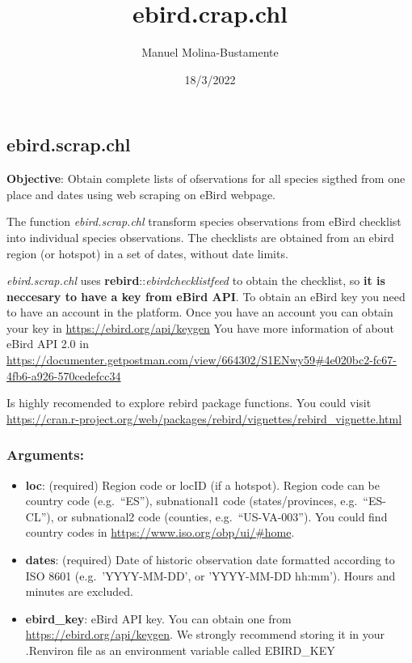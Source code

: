 \documentclass[
]{article}
\title{ebird.crap.chl}
\author{Manuel Molina-Bustamente}
\date{18/3/2022}
\begin{document}
\maketitle

\hypertarget{ebird.scrap.chl}{%
\subsection{ebird.scrap.chl}\label{ebird.scrap.chl}}

\textbf{Objective}: Obtain complete lists of ofservations for all
species sigthed from one place and dates using web scraping on eBird
webpage.

The function \emph{ebird.scrap.chl} transform species observations from
eBird checklist into individual species observations. The checklists are
obtained from an ebird region (or hotspot) in a set of dates, without
date limits.

\emph{ebird.scrap.chl} uses \textbf{rebird}::\emph{ebirdchecklistfeed}
to obtain the checklist, so \textbf{it is neccesary to have a key from
eBird API}. To obtain an eBird key you need to have an account in the
platform. Once you have an account you can obtain your key in
\url{https://ebird.org/api/keygen} You have more information of about
eBird API 2.0 in
\url{https://documenter.getpostman.com/view/664302/S1ENwy59\#4e020bc2-fc67-4fb6-a926-570cedefcc34}

Is highly recomended to explore rebird package functions. You could
visit
\url{https://cran.r-project.org/web/packages/rebird/vignettes/rebird_vignette.html}

\hypertarget{arguments}{%
\subsubsection{Arguments:}\label{arguments}}

\begin{itemize}
\item
  \textbf{loc}: (required) Region code or locID (if a hotspot). Region
  code can be country code (e.g.~``ES''), subnational1 code
  (states/provinces, e.g.~``ES-CL''), or subnational2 code (counties,
  e.g.~``US-VA-003''). You could find country codes in
  \url{https://www.iso.org/obp/ui/\#home}.
\item
  \textbf{dates}: (required) Date of historic observation date formatted
  according to ISO 8601 (e.g.~'YYYY-MM-DD', or 'YYYY-MM-DD hh:mm').
  Hours and minutes are excluded.
\item
  \textbf{ebird\_key}: eBird API key. You can obtain one from
  \url{https://ebird.org/api/keygen}. We strongly recommend storing it
  in your .Renviron file as an environment variable called EBIRD\_KEY
\end{itemize}
\end{document}
